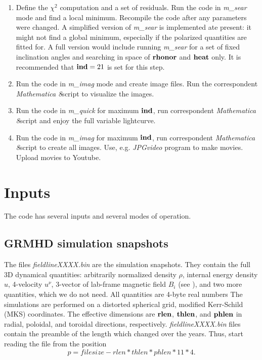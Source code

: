 \documentclass{emulateapj}
\newcommand{\mat}{\textit{Mathematica 8}}
\begin{document}
\begin{enumerate}
\item{Define the $\chi^2$ computation and a set of residuals.  Run the code in \textit{m\_sear} mode and find a local minimum. Recompile the code after any parameters were changed.
A simplified version of \textit{m\_sear} is implemented ate present: it might not find a global minimum, especially if the polarized quantities are fitted for.
A full version would include running \textit{m\_sear} for a set of fixed inclination angles and searching in space of $\bf rhonor$ and $\bf heat$ only.
It is recommended that ${\bf ind}=21$ is set for this step.}
\item{Run the code in \textit{m\_imag} mode and create image files. Run the correspondent \mat script to visualize the images.}
\item{Run the code in \textit{m\_quick} for maximum $\bf ind$, run correspondent \mat script and enjoy the full variable lightcurve.}
\item{Run the code in \textit{m\_imag} for maximum $\bf ind$, run correspondent \mat script to create all images. Use, e.g. \textit{JPGvideo} program to make movies.
Upload movies to Youtube.}
\end{enumerate}



\section{Inputs}
The code has several inputs and several modes of operation.
\subsection{GRMHD simulation snapshots}
The files \textit{fieldlineXXXX.bin} are the simulation snapshots. They contain the full 3D dynamical quantities: arbitrarily normalized density $\rho$, internal energy density $u$,
4-velocity $u^\nu$, 3-vector of lab-frame magnetic field $B_i$ (see \citealt{Penna:2010dj}), and two more quantities, which we do not need. All quantities are 4-byte real numbers
The simulations are performed on a distorted spherical grid, modified Kerr-Schild (MKS) coordinates. The effective dimensions are ${\bf rlen}$, ${\bf thlen}$, and ${\bf phlen}$
in radial, poloidal, and toroidal directions, respectively. \textit{fieldlineXXXX.bin} files contain the preamble of the length which changed over the years.
Thus, start reading the file from the position
\begin{equation}
p=filesize-rlen*thlen*phlen*11*4.
\end{equation}
\end{document}
